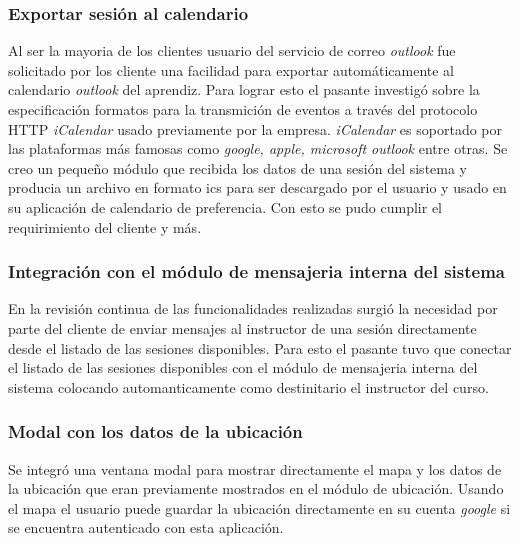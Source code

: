 \subsubsection{Exportar sesión al calendario}

Al ser la mayoria de los clientes usuario del servicio de correo \emph{outlook} fue solicitado por los cliente una facilidad para exportar automáticamente al calendario \emph{outlook} del aprendiz. Para lograr esto el pasante investigó sobre la especificación formatos para la transmición de eventos a través del protocolo HTTP \emph{iCalendar} usado previamente por la empresa. \emph{iCalendar} es soportado por las plataformas más famosas como \emph{google, apple, microsoft outlook} entre otras. Se creo un pequeño módulo que recibida los datos de una sesión del sistema y producia un archivo en formato ics para ser descargado por el usuario y usado en su aplicación de calendario de preferencia. Con esto se pudo cumplir el requirimiento del cliente y más.

\subsubsection{Integración con el módulo de mensajeria interna del sistema}

En la revisión continua de las funcionalidades realizadas surgió la necesidad por parte del cliente de enviar mensajes al instructor de una sesión directamente desde el listado de las sesiones disponibles. Para esto el pasante tuvo que conectar el listado de las sesiones disponibles con el módulo de mensajeria interna del sistema colocando automanticamente como destinitario el instructor del curso.

\subsubsection{Modal con los datos de la ubicación}

Se integró una ventana modal para mostrar directamente el mapa y los datos de la ubicación que eran previamente mostrados en el módulo de ubicación. Usando el mapa el usuario puede guardar la ubicación directamente en su cuenta \emph{google} si se encuentra autenticado con esta aplicación.






